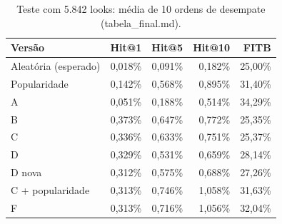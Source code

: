 \begin{table}[t]
\centering
\caption{Teste com 5.842 looks: média de 10 ordens de desempate (tabela\_final.md).}
\label{tab:final}
\footnotesize
\begin{tabular}{lrrrr}
\toprule
Versão & Hit@1 & Hit@5 & Hit@10 & FITB \\
\midrule
Aleatória (esperado) & 0,018\% & 0,091\% & 0,182\% & 25,00\% \\
Popularidade & 0,142\% & 0,568\% & 0,895\% & 31,40\% \\
A & 0,051\% & 0,188\% & 0,514\% & 34,29\% \\
B & 0,373\% & 0,647\% & 0,772\% & 25,35\% \\
C & 0,336\% & 0,633\% & 0,751\% & 25,37\% \\
D & 0,329\% & 0,531\% & 0,659\% & 28,14\% \\
D nova & 0,312\% & 0,575\% & 0,688\% & 27,26\% \\
C + popularidade & 0,313\% & 0,746\% & 1,058\% & 31,63\% \\
F & 0,313\% & 0,716\% & 1,056\% & 32,04\% \\
\bottomrule
\end{tabular}
\end{table}
